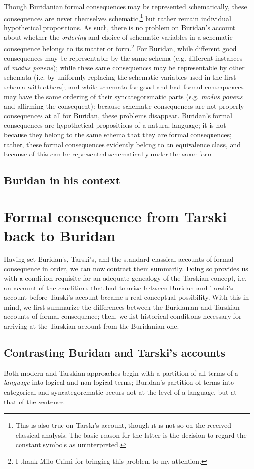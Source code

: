 \documentclass[]{article}
\begin{document}
Though Buridanian formal consequences may be represented schematically, these consequences are never themselves schematic,\footnote{This is also true on Tarski's account, though it is not so on the received classical analysis. The basic reason for the latter is the decision to regard the constant symbols as uninterpreted.} but rather remain individual hypothetical propositions. As such, there is no problem on Buridan's account about whether the \textit{ordering} and choice of schematic variables in a schematic consequence belongs to its matter or form.\footnote{I thank Milo Crimi for bringing this problem to my attention.} For Buridan, while different good consequences may be representable by the same schema (e.g. different instances of \textit{modus ponens}); while these same consequences may be representable by other schemata (i.e. by uniformly replacing the schematic variables used in the first schema with others); and while schemata for good and bad formal consequences may have the same ordering of their syncategorematic parts (e.g. \textit{modus ponens} and affirming the consequent): because schematic consequences are not properly consequences at all for Buridan, these problems disappear. Buridan's formal consequences are hypothetical propositions of a natural language; it is not because they belong to the same schema that they are formal consequences; rather, these formal consequences evidently belong to an equivalence class, and because of this can be represented schematically under the same form.
\subsection{Buridan in his context}
\section{Formal consequence from Tarski back to Buridan}
Having set Buridan's, Tarski's, and the standard classical accounts of formal consequence in order, we can now contrast them summarily. Doing so provides us with a condition requisite for an adequate genealogy of the Tarskian concept, i.e. an account of the conditions that had to arise between Buridan and Tarski's account before Tarski's account became a real conceptual possibility. With this in mind, we first summarize the differences between the Buridanian and Tarskian accounts of formal consequence; then, we list historical conditions necessary for arriving at the Tarskian account from the Buridanian one.
\subsection{Contrasting Buridan and Tarski's accounts}
Both modern and Tarskian approaches begin with a partition of all terms of a \textit{language} into logical and non-logical terms; Buridan's partition of terms into categorical and syncategorematic occurs not at the level of a language, but at that of the sentence. 
\end{document}
